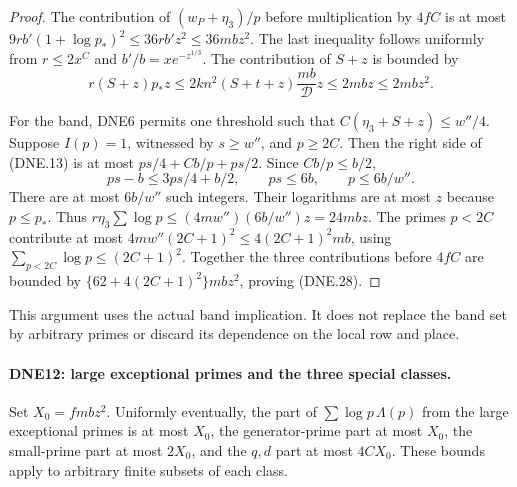 \documentclass[11pt,a4paper]{article}
\numberwithin{equation}{section}
\theoremstyle{remark}\newtheorem{remark}[theorem]{Remark}
\begin{document}
\begin{proof}
The contribution of $(w_P+\eta_3)/p$ before multiplication by
$4fC$ is at most
$9rb'(1+\log p_*)^2\le36rb'z^2\le36mbz^2$.
The last inequality follows uniformly from
$r\le2x^C$ and $b'/b=xe^{-z^{1/3}}$.
The contribution of $S+z$ is bounded by
\[
 r(S+z)p_*z
   \le2kn^2(S+t+z)\frac{mb}{\mathcal D}z
   \le2mbz\le2mbz^2.                                  \tag{DNE.29}
\]

For the band, DNE6 permits one threshold such that
$C(\eta_3+S+z)\le w''/4$.  Suppose $I(p)=1$, witnessed by
$s\ge w''$, and $p\ge2C$.  Then the right side of (DNE.13)
is at most $ps/4+Cb/p+ps/2$.  Since $Cb/p\le b/2$,
\[
 ps-b\le3ps/4+b/2,\qquad ps\le6b,
                         \qquad p\le6b/w''.             \tag{DNE.30}
\]
There are at most $6b/w''$ such integers.  Their logarithms are
at most $z$ because $p\le p_*$.  Thus
$r\eta_3\sum\log p\le(4mw'')(6b/w'')z=24mbz$.
The primes $p<2C$ contribute at most
$4mw''(2C+1)^2\le4(2C+1)^2mb$, using
$\sum_{p<2C}\log p\le(2C+1)^2$.
Together the three contributions before $4fC$ are bounded by
$\{62+4(2C+1)^2\}mbz^2$, proving (DNE.28).
\end{proof}

This argument uses the actual band implication.  It does not
replace the band set by arbitrary primes or discard its dependence
on the local row and place.

\paragraph{DNE12: large exceptional primes and the three special classes.}
\label{claim:DNE12}
Set $X_0=fm bz^2$.  Uniformly eventually, the part of
$\sum\log p\,\Lambda(p)$ from the large exceptional primes is
at most $X_0$, the generator-prime part at most $X_0$, the
small-prime part at most $2X_0$, and the $q,d$ part at most
$4CX_0$.  These bounds apply to arbitrary finite subsets of each class.
\end{document}
